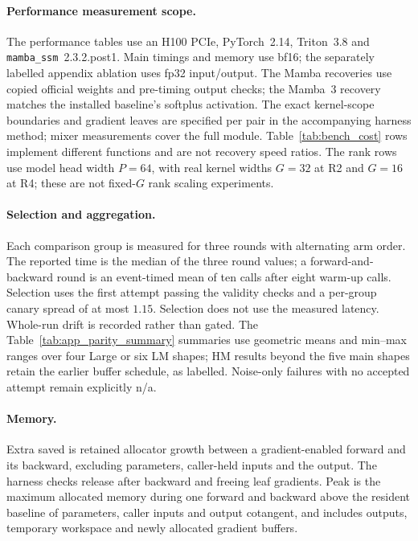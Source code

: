 \paragraph{Performance measurement scope.}
The performance tables use an H100 PCIe, PyTorch~2.14, Triton~3.8 and
\texttt{mamba\_ssm}~2.3.2.post1. Main timings and memory use bf16;
the separately labelled appendix ablation uses fp32 input/output.
The Mamba recoveries use copied official weights and pre-timing output checks;
the Mamba~3 recovery matches the installed baseline's softplus activation.
The exact kernel-scope boundaries and gradient leaves are specified per pair
in the accompanying harness method; mixer measurements cover the full module.
Table~\ref{tab:bench_cost} rows implement different functions and are not recovery speed ratios.
The rank rows use model head width $P=64$, with real kernel widths $G=32$
at R2 and $G=16$ at R4; these are not fixed-$G$ rank scaling experiments.

\paragraph{Selection and aggregation.}
Each comparison group is measured for three rounds with alternating arm order.
The reported time is the median of the three round values; a forward-and-backward
round is an event-timed mean of ten calls after eight warm-up calls. Selection
uses the first attempt passing the validity checks and a per-group canary spread
of at most $1.15$. Selection does not use the measured latency. Whole-run drift
is recorded rather than gated. The Table~\ref{tab:app_parity_summary} summaries use geometric means and
min--max ranges over four Large or six LM shapes; HM results beyond the
five main shapes retain the earlier buffer schedule, as labelled. Noise-only failures with no
accepted attempt remain explicitly n/a.

\paragraph{Memory.}
Extra saved is retained allocator growth between a gradient-enabled
forward and its backward, excluding parameters, caller-held inputs and the
output. The harness checks release after backward and freeing leaf gradients.
Peak is the maximum allocated memory during one forward and backward above
the resident baseline of parameters, caller inputs and output cotangent,
and includes outputs, temporary workspace and newly allocated gradient buffers.

